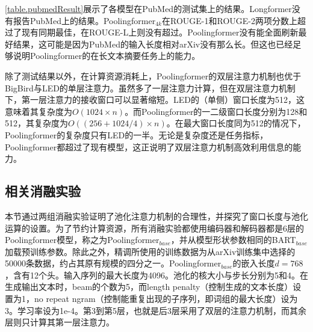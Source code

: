 \autoref{table.pubmedResult}展示了各模型在PubMed的测试集上的结果。Longformer没有报告PubMed上的结果。Poolingformer$_{4k}$在ROUGE-1和ROUGE-2两项分数上超过了现有同期最佳，在ROUGE-L上则没有超过。Poolingformer没有能全面刷新最好结果，这可能是因为PubMed的输入长度相对arXiv没有那么长。但这也已经足够说明Poolingformer的在长文本摘要任务上的能力。

除了测试结果以外，在计算资源消耗上，Poolingformer的双层注意力机制也优于BigBird与LED的单层注意力。虽然多了一层注意力计算，但在双层注意力机制下，第一层注意力的接收窗口可以显著缩短。LED的（单侧）窗口长度为512，这意味着其复杂度为$O(1024 \times n)$。而Poolingformer的一二级窗口长度分别为128和512，其复杂度为$O((256+1024/4)\times n)$。在最大窗口长度同为512的情况下，Poolingformer的复杂度只有LED的一半。无论是复杂度还是任务指标，Poolingformer都超过了现有模型，这正说明了双层注意力机制高效利用信息的能力。

\subsection{相关消融实验}

本节通过两组消融实验证明了池化注意力机制的合理性，并探究了窗口长度与池化运算的设置。为了节约计算资源，所有消融实验都使用编码器和解码器都是6层的Poolingformer模型，称之为Poolingformer$_{base}$，并从模型形状参数相同的BART$_{base}$加载预训练参数。除此之外，精调所使用的训练数据为从arXiv训练集中选择的50000条数据，约占其原有规模的四分之一。Poolingformer$_{base}$的嵌入长度$d=768$，含有12个头。输入序列的最大长度为4096。池化的核大小与步长分别为5和4。在生成输出文本时，beam的个数为5，而length penalty（控制生成的文本长度）设置为1，no repeat ngram（控制能重复出现的子序列，即词组的最大长度）设为3。学习率设为1e-4。第3到第5层，也就是后3层采用了双层的注意力机制，而其余层则只计算其第一层注意力。

\begin{table}[ht]
\caption{Poolingformer$_{base}$在arXiv测试集上关于第一、第二层注意力窗口长度$w_1$、$w_2$的消融实验结果。}
\label{table.ablationWindowSize}
\begin{center}
\end{center}
\end{table}

